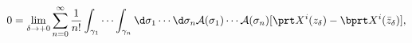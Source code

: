 \begin{equation}
0=\lim_{\delta \rightarrow +0}
\sum_{n=0}^\infty
\frac{1}{n!}\int_{\gamma_1}\cdots \int_{\gamma_n}
\d \sigma_1 \cdots \d \sigma_n {\cal A}(\sigma_1)
\cdots {\cal A}(\sigma_n)
[\prt X^i(z_{\delta})-\bprt X^i(\bar z_\delta)],
\label{def of deform}
\end{equation}

